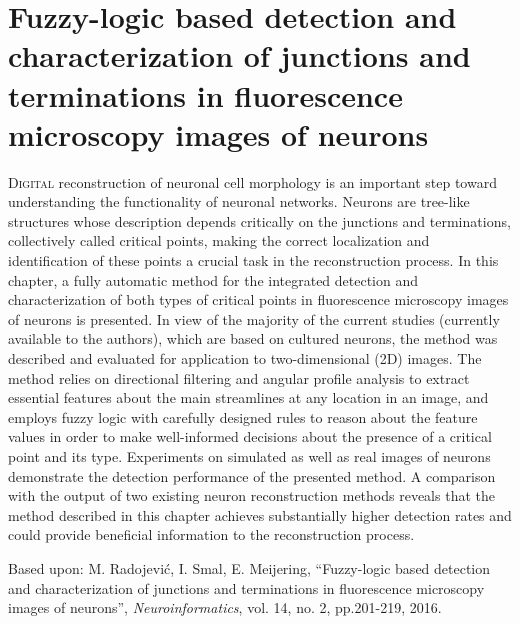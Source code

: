 % 
%
\chpos{15mm}{8mm}
\chapter[Fuzzy-logic based detection and characterization of junctions and terminations in fluorescence microscopy images of neurons]{Fuzzy-logic based detection and characterization of junctions and terminations in fluorescence microscopy images of neurons}
\label{ch2:fuzzy}
{\small \lettrine{D}{igital} reconstruction of neuronal cell morphology is an important step toward understanding the functionality of neuronal networks. Neurons are tree-like structures whose description depends critically on the junctions and terminations, collectively called critical points, making the correct localization and identification of these points a crucial task in the reconstruction process. In this chapter, a fully automatic method for the integrated detection and characterization of both types of critical points in fluorescence microscopy images of neurons is presented. In view of the majority of the current studies (currently available to the authors), which are based on cultured neurons, the method was described and evaluated for application to two-dimensional (2D) images. The method relies on directional filtering and angular profile analysis to extract essential features about the main streamlines at any location in an image, and employs fuzzy logic with carefully designed rules to reason about the feature values in order to make well-informed decisions about the presence of a critical point and its type. Experiments on simulated as well as real images of neurons demonstrate the detection performance of the presented method. A comparison with the output of two existing neuron reconstruction methods reveals that the method described in this chapter achieves substantially higher detection rates and could provide beneficial information to the reconstruction process.\par}
\vspace*{11em}
\begin{publish}
Based upon: M. Radojevi\'{c}, I. Smal, E. Meijering, ``Fuzzy-logic based detection and characterization of junctions and terminations in fluorescence microscopy images of neurons'', \textit{Neuroinformatics}, vol. 14, no. 2, pp.201-219, 2016.
\end{publish}

